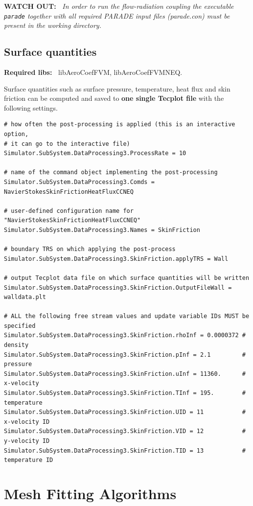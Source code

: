\documentclass[11pt]{article}
\begin{document}
{\bf WATCH OUT:~} {\it In order to run the flow-radiation coupling the executable {\tt parade} together 
  with all required PARADE input files (parade.con) must be present in the working directory.}

\subsection{Surface quantities}

{\bf Required libs:~} libAeroCoefFVM, libAeroCoefFVMNEQ.

Surface quantities such as surface pressure, temperature, heat flux and skin friction
can be computed and saved to {\bf one single Tecplot file} with the following settings.

\begin{verbatim}
# how often the post-processing is applied (this is an interactive option, 
# it can go to the interactive file)
Simulator.SubSystem.DataProcessing3.ProcessRate = 10

# name of the command object implementing the post-processing
Simulator.SubSystem.DataProcessing3.Comds = NavierStokesSkinFrictionHeatFluxCCNEQ

# user-defined configuration name for "NavierStokesSkinFrictionHeatFluxCCNEQ"
Simulator.SubSystem.DataProcessing3.Names = SkinFriction

# boundary TRS on which applying the post-process
Simulator.SubSystem.DataProcessing3.SkinFriction.applyTRS = Wall

# output Tecplot data file on which surface quantities will be written
Simulator.SubSystem.DataProcessing3.SkinFriction.OutputFileWall = walldata.plt

# ALL the following free stream values and update variable IDs MUST be specified
Simulator.SubSystem.DataProcessing3.SkinFriction.rhoInf = 0.0000372 # density
Simulator.SubSystem.DataProcessing3.SkinFriction.pInf = 2.1         # pressure
Simulator.SubSystem.DataProcessing3.SkinFriction.uInf = 11360.      # x-velocity
Simulator.SubSystem.DataProcessing3.SkinFriction.TInf = 195.        # temperature
Simulator.SubSystem.DataProcessing3.SkinFriction.UID = 11           # x-velocity ID
Simulator.SubSystem.DataProcessing3.SkinFriction.VID = 12           # y-velocity ID
Simulator.SubSystem.DataProcessing3.SkinFriction.TID = 13           # temperature ID
\end{verbatim}

\section{Mesh Fitting Algorithms}
\end{document}
